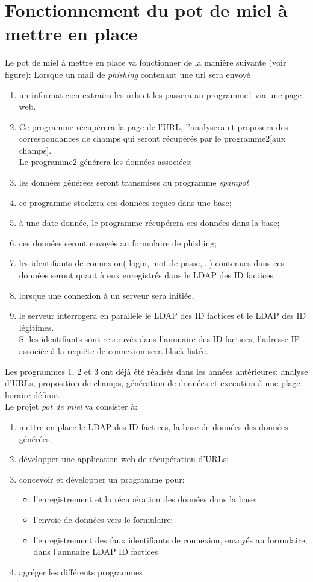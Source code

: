 \section{Fonctionnement du pot de miel à mettre en place}
Le pot de miel à mettre en place va fonctionner de la manière suivante
(voir figure):
Lorsque un mail de \emph{phishing} contenant une url sera envoyé
\begin{enumerate}
	\item un informaticien extraira les urls et les passera au programme1
		via une page web.
	\item	Ce programme récupèrera la page de l'URL, l'analysera et proposera
		des correspondances de champs qui seront récupérés par le
		programme2[aux champs].\\
		Le programme2 générera les données associées;
	\item les données générées seront transmises au programme \emph{spampot}
	\item ce programme  stockera ces données reçues dans une base;
	\item à une date donnée, le programme récupérera ces données 
		dans la base;
	\item ces données seront envoyés au formulaire de phishing;
	\item les identifiants de connexion( login, mot de passe,...)
		contenues dans ces données seront 
		quant à eux enregistrés dans le LDAP des ID factices
	\item lorsque une connexion à un serveur sera initiée, 
	\item le serveur interrogera en parallèle le LDAP des ID factices et 
		le LDAP des ID légitimes.\\
		Si les identifiants sont retrouvés dans l'annuaire des ID factices,
		l'adresse IP associée à la requête de connexion sera black-listée.
\end{enumerate}
Les programmes 1, 2 et 3 ont déjà été réalisés dans les années antérieures:
analyse 
d'URLs, proposition de champs, génération de données et execution 
à une plage horaire définie.
\\
Le projet \emph{pot de miel} va consister à:
\begin{enumerate}
	\item mettre en place le LDAP des ID factices, la base de données des 
		données générées;
	\item développer une application web de récupération d'URLs;
	\item concevoir et développer un programme pour: 
		\begin{itemize}
			\item l'enregistrement et la récupération des données dans 
				la base;
			\item l'envoie de données vers le formulaire;
			\item l'enregistrement des faux identifiants de connexion,
				envoyés au  formulaire, dans l'annuaire LDAP ID factices
		\end{itemize}
	\item agréger les différents programmes
\end{enumerate}
